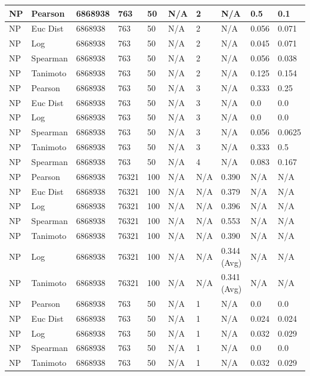 \documentclass{article}
\begin{document}
\begin{longtable}{ |p{1.7cm}|p{1.9cm}|p{1.5cm}|p{1.5cm}|p{0.75cm}|p{0.75cm}|p{0.75cm}|p{0.75cm}|p{1.5cm}|p{1.5cm}|}
    NP & Pearson & 6868938 & 763 & 50 &  N/A & 2 & N/A & 0.5 & 0.1  \\ \hline
    NP & Euc Dist & 6868938 & 763 & 50 & N/A &  2 & N/A &0.056 & 0.071   \\ \hline
    NP & Log & 6868938 & 763 & 50 &  N/A &  2 & N/A & 0.045 & 0.071 \\ \hline
    NP & Spearman & 6868938 & 763 & 50 & N/A &  2 & N/A & 0.056 & 0.038 \\ \hline
    NP & Tanimoto & 6868938 & 763 & 50 & N/A &  2 & N/A & 0.125 & 0.154 \\ \hline
    
    NP & Pearson & 6868938 & 763 & 50&  N/A & 3 & N/A & 0.333 & 0.25  \\ \hline
    NP & Euc Dist & 6868938 & 763 & 50 & N/A & 3  & N/A &0.0 & 0.0   \\ \hline
    NP & Log & 6868938 & 763 & 50 &  N/A & 3  & N/A & 0.0 & 0.0  \\ \hline
    NP & Spearman & 6868938 & 763 & 50 & N/A & 3  & N/A &0.056 & 0.0625 \\ \hline
    NP & Tanimoto & 6868938 & 763 & 50 & N/A & 3 & N/A & 0.333 & 0.5 \\ \hline
    NP & Spearman & 6868938 & 763 & 50 & N/A &  4 & N/A & 0.083 & 0.167 \\ \hline
    
    NP & Pearson & 6868938 & 76321 & 100 &  N/A & N/A & 0.390 & N/A & N/A  \\ \hline
    NP & Euc Dist & 6868938 & 76321 & 100 & N/A & N/A & 0.379 & N/A & N/A   \\ \hline
    NP & Log & 6868938 & 76321 & 100 &  N/A & N/A & 0.396 & N/A & N/A  \\ \hline
    NP & Spearman & 6868938 & 76321 & 100 & N/A & N/A & 0.553 & N/A & N/A \\ \hline
    NP & Tanimoto & 6868938 & 76321 & 100 & N/A & N/A & 0.390 & N/A & N/A \\ \hline
    NP & Log & 6868938 & 76321 & 100 & N/A & N/A & 0.344 (Avg) & N/A & N/A \\ \hline
    NP & Tanimoto & 6868938 & 76321 & 100 & N/A & N/A & 0.341 (Avg) & N/A & N/A \\ \hline
    
    NP & Pearson & 6868938 & 763 & 50 &  N/A & 1 & N/A & 0.0 & 0.0  \\ \hline
    NP & Euc Dist & 6868938 & 763 & 50 & N/A & 1 & N/A &0.024 & 0.024   \\ \hline
    NP & Log & 6868938 & 763 & 50 &  N/A & 1 & N/A & 0.032 & 0.029  \\ \hline
    NP & Spearman & 6868938 & 763 & 50 & N/A & 1 & N/A &0.0 & 0.0 \\ \hline
    NP & Tanimoto & 6868938 & 763 & 50 & N/A & 1 & N/A & 0.032 & 0.029 \\ \hline
    

\end{longtable}
\end{document}
